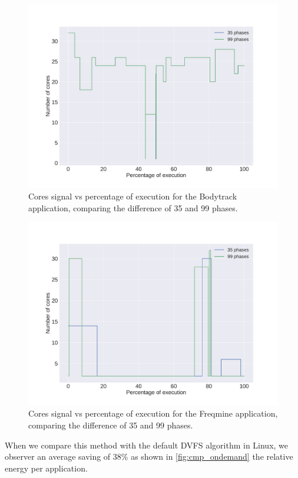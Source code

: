 \begin{figure}[h]
	\centering
	\includegraphics[width=\columnwidth]{phases/figures/signals/completo_bodytrack_1_cores_signals_cmp.pdf}
	\caption{Cores signal vs percentage of execution for the Bodytrack application, comparing the difference of 35 and 99 phases.}
\end{figure}%
\begin{figure}[h]
	\centering
	\includegraphics[width=\columnwidth]{phases/figures/signals/completo_freq_cores_signals_cmp.pdf}
	\caption{Cores signal vs percentage of execution for the Freqmine application, comparing the difference of 35 and 99 phases.}
\end{figure}%

When we compare this method with the default DVFS algorithm in Linux, we observer an average saving of 38\% as shown in \cref{fig:cmp_ondemand} the relative energy per application.

